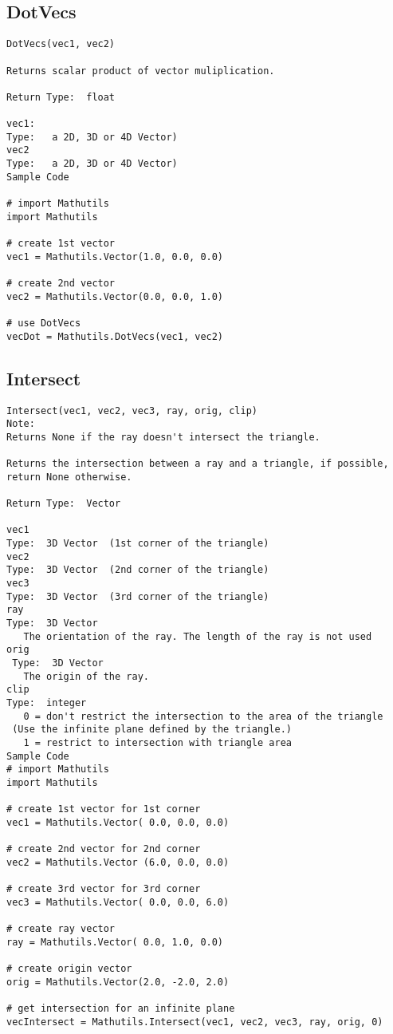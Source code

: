 \subsection{DotVecs}
\begin{verbatim}
DotVecs(vec1, vec2)

Returns scalar product of vector muliplication.

Return Type:  float

vec1:
Type:   a 2D, 3D or 4D Vector)
vec2
Type:   a 2D, 3D or 4D Vector)
Sample Code

# import Mathutils
import Mathutils

# create 1st vector 
vec1 = Mathutils.Vector(1.0, 0.0, 0.0)

# create 2nd vector 
vec2 = Mathutils.Vector(0.0, 0.0, 1.0)

# use DotVecs
vecDot = Mathutils.DotVecs(vec1, vec2)
\end{verbatim}


\subsection{Intersect}
\begin{verbatim}
Intersect(vec1, vec2, vec3, ray, orig, clip)
Note:
Returns None if the ray doesn't intersect the triangle.

Returns the intersection between a ray and a triangle, if possible, return None otherwise.

Return Type:  Vector

vec1
Type:  3D Vector  (1st corner of the triangle)
vec2
Type:  3D Vector  (2nd corner of the triangle)
vec3
Type:  3D Vector  (3rd corner of the triangle)
ray
Type:  3D Vector 
   The orientation of the ray. The length of the ray is not used
orig
 Type:  3D Vector
   The origin of the ray.
clip 
Type:  integer 
   0 = don't restrict the intersection to the area of the triangle
 (Use the infinite plane defined by the triangle.)
   1 = restrict to intersection with triangle area
Sample Code
# import Mathutils
import Mathutils

# create 1st vector for 1st corner
vec1 = Mathutils.Vector( 0.0, 0.0, 0.0)

# create 2nd vector for 2nd corner
vec2 = Mathutils.Vector (6.0, 0.0, 0.0)

# create 3rd vector for 3rd corner
vec3 = Mathutils.Vector( 0.0, 0.0, 6.0)

# create ray vector 
ray = Mathutils.Vector( 0.0, 1.0, 0.0)

# create origin vector
orig = Mathutils.Vector(2.0, -2.0, 2.0)

# get intersection for an infinite plane
vecIntersect = Mathutils.Intersect(vec1, vec2, vec3, ray, orig, 0)
\end{verbatim}

